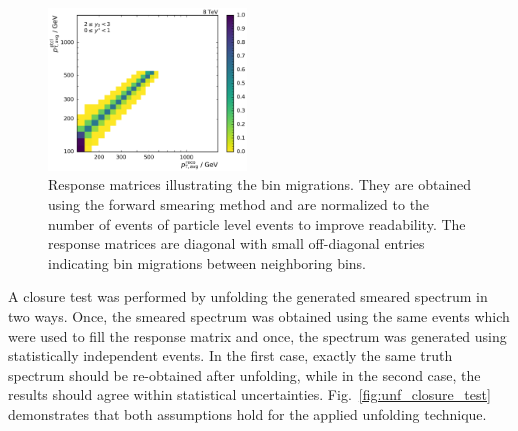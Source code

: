 \begin{figure}[htp]
    \includegraphics[width=0.47\textwidth]{figures/measurement/res_matrix_ptavg_normalized_yb2ys0.pdf}
    \caption[Response matrix used for the unfolding]{Response matrices
        illustrating the bin migrations. They are obtained using the forward smearing method and are normalized
        to the number of events of particle level events to improve readability. The response
        matrices are diagonal with small off-diagonal entries indicating bin
    migrations between neighboring \ptavg bins.}
    \label{fig:res_matrix}
\end{figure}

A closure test was performed by unfolding the generated smeared spectrum in two
ways. Once, the smeared spectrum was obtained using the same events which were
used to fill the response matrix and once, the spectrum was generated using
statistically independent events. In the first case, exactly the same truth
spectrum should be re-obtained after unfolding, while in the second case, the
results should agree within statistical uncertainties.
Fig.~\ref{fig:unf_closure_test} demonstrates that both assumptions hold for the
applied unfolding technique.

